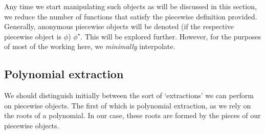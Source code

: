 Any time we start manipulating such objects as will be discussed in this section, we reduce the number of functions that satisfy the piecewise definition provided. Generally, anonymous piecewise objects will be denoted (if the respective piecewise object is $\phi$) $\phi^\star$. This will be explored further. However, for the purposes of most of the working here, we \textit{minimally} interpolate.

\subsection{Polynomial extraction}
We should distinguish initially between the sort of `extractions' we can perform on piecewise objects. The first of which is polynomial extraction, as we rely on the roots of a polynomial. In our case, these roots are formed by the pieces of our piecewise objects.

